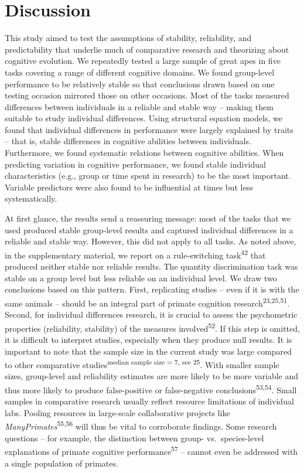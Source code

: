 \documentclass[
  man,floatsintext]{apa6}
\begin{document}
\hypertarget{discussion}{%
\section{Discussion}\label{discussion}}

This study aimed to test the assumptions of stability, reliability, and predictability that underlie much of comparative research and theorizing about cognitive evolution. We repeatedly tested a large sample of great apes in five tasks covering a range of different cognitive domains. We found group-level performance to be relatively stable so that conclusions drawn based on one testing occasion mirrored those on other occasions. Most of the tasks measured differences between individuals in a reliable and stable way -- making them suitable to study individual differences. Using structural equation models, we found that individual differences in performance were largely explained by traits -- that is, stable differences in cognitive abilities between individuals. Furthermore, we found systematic relations between cognitive abilities. When predicting variation in cognitive performance, we found stable individual characteristics (e.g., group or time spent in research) to be the most important. Variable predictors were also found to be influential at times but less systematically.

At first glance, the results send a reassuring message: most of the tasks that we used produced stable group-level results and captured individual differences in a reliable and stable way. However, this did not apply to all tasks. As noted above, in the supplementary material, we report on a rule-switching task\textsuperscript{42} that produced neither stable nor reliable results. The quantity discrimination task was stable on a group level but less reliable on an individual level. We draw two conclusions based on this pattern. First, replicating studies -- even if it is with the same animals -- should be an integral part of primate cognition research\textsuperscript{23,25,51}. Second, for individual differences research, it is crucial to assess the psychometric properties (reliability, stability) of the measures involved\textsuperscript{52}. If this step is omitted, it is difficult to interpret studies, especially when they produce null results. It is important to note that the sample size in the current study was large compared to other comparative studies\textsuperscript{median sample size = 7, see 25}. With smaller sample sizes, group-level and reliability estimates are more likely to be more variable and thus more likely to produce false-positive or false-negative conclusions\textsuperscript{53,54}. Small samples in comparative research usually reflect resource limitations of individual labs. Pooling resources in large-scale collaborative projects like \emph{ManyPrimates}\textsuperscript{55,56} will thus be vital to corroborate findings. Some research questions -- for example, the distinction between group- vs.~species-level explanations of primate cognitive performance\textsuperscript{57} -- cannot even be addressed with a single population of primates.
\end{document}
